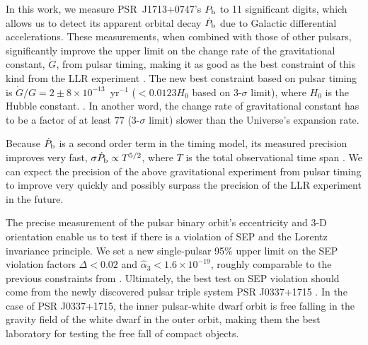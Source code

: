 In this work, we measure PSR~J1713+0747's $P_{\rm b}$ to 11 significant
digits, which allows us to detect its apparent orbital decay $\dot{P}_{\rm b}$ due to Galactic differential accelerations.
These measurements, when combined with those of other pulsars, 
significantly improve the upper limit on the change rate of the gravitational
 constant, $\dot{G}$, from pulsar timing, making it as good as the best
constraint of this kind from the LLR experiment \citep{hmb10}.
The new best constraint based on pulsar timing is $\dot{G}/G
=2\pm8\times10^{-13}$~yr$^{-1}$ ($<0.0123H_0$ based on 3-$\sigma$ limit), where $H_0$ is the Hubble constant. . 
In another word, the change rate of gravitational constant has to be a factor
of at least $77$ (3-$\sigma$ limit) slower than the Universe's expansion rate.

Because $\dot P_{\rm b}$ is a second order term in the timing 
model, its measured precision improves very fast, $\sigma \dot
P_{\rm b} \propto T^{5/2}$, where $T$ is the total observational time
span \cite{dt92}.
We can expect the precision of the above gravitational experiment from pulsar
timing to improve very quickly and possibly surpass the precision
of the LLR
experiment in the future.

The precise measurement of the pulsar binary orbit's eccentricity and
3-D orientation enable us to test if there is a violation of SEP and the
Lorentz invariance principle. We set a new single-pulsar 95\% upper limit on the SEP violation
factors $\Delta <0.02$ and $\hat{\alpha}_3<1.6\times10^{-19}$, roughly comparable
to the previous constraints from \citealt{wex00, sns+05, sfl+05, gsf+11}.
Ultimately, the best test on SEP violation should come from the newly
discovered pulsar triple system PSR J0337+1715 \citep{rsa+14}. In the case of
PSR J0337+1715, the
inner pulsar-white dwarf orbit is free falling in the gravity field of the
white dwarf in the outer orbit, making them the best laboratory for testing
the free fall of compact objects.



